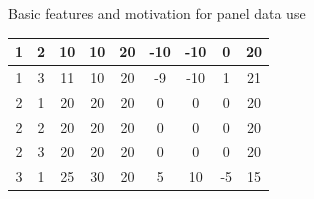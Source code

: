 \documentclass[usenames,dvipsnames]{beamer}
\begin{document}
\begin{frame}{Basic features and motivation for panel data use}
\begin{table}[]
{\begin{tabular}{|c|c|c|c|c|c|c|c|c|}
1   & 2    & 10       & 10                                                        & 20                                                     & -10                                                         & -10                                                         & 0                                                          & 20                                                                      \\ \hline
1   & 3    & 11       & 10                                                        & 20                                                     & -9                                                          & -10                                                         & 1                                                          & 21                                                                      \\ \hline
2   & 1    & 20       & 20                                                        & 20                                                     & 0                                                           & 0                                                           & 0                                                          & 20                                                                      \\ \hline
2   & 2    & 20       & 20                                                        & 20                                                     & 0                                                           & 0                                                           & 0                                                          & 20                                                                      \\ \hline
2   & 3    & 20       & 20                                                        & 20                                                     & 0                                                           & 0                                                           & 0                                                          & 20                                                                      \\ \hline
3   & 1    & 25       & 30                                                        & 20                                                     & 5                                                           & 10                                                          & -5                                                         & 15                                                                      \\ \hline

\end{tabular}}
\end{table}
\end{frame}
\end{document}
